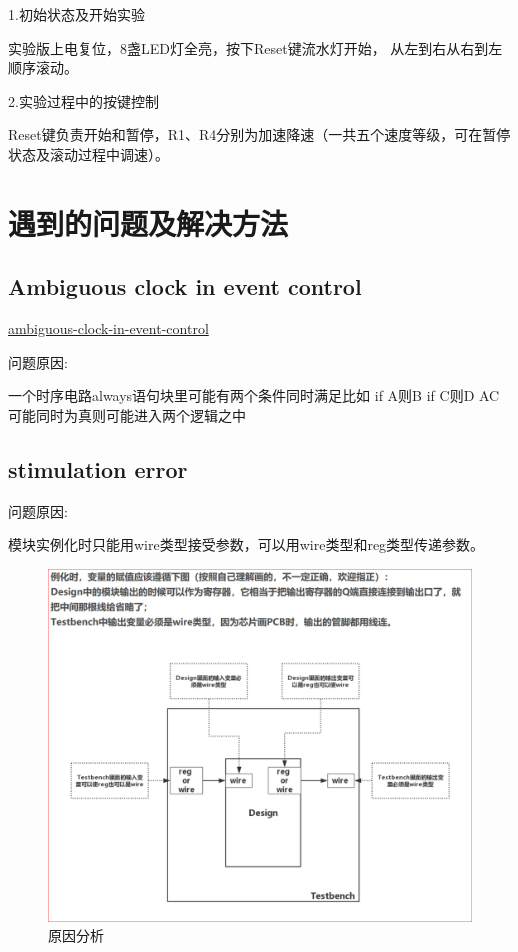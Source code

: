 \documentclass[UTF8]{article}
\begin{document}
1.初始状态及开始实验

实验版上电复位，8盏LED灯全亮，按下Reset键流水灯开始，
从左到右从右到左顺序滚动。

2.实验过程中的按键控制

Reset键负责开始和暂停，R1、R4分别为加速降速（一共五个速度等级，可在暂停状态及滚动过程中调速）。

\section{遇到的问题及解决方法}
\subsection{Ambiguous clock in event control}

\href{https://stackoverflow.com/questions/27145548/ambiguous-clock-in-event-control}{ambiguous-clock-in-event-control} 

问题原因: 

一个时序电路always语句块里可能有两个条件同时满足比如
    if A则B
    if C则D
AC可能同时为真则可能进入两个逻辑之中

\subsection{stimulation error}
问题原因:

模块实例化时只能用wire类型接受参数，可以用wire类型和reg类型传递参数。

\begin{figure}[H]
    \centering
    \includegraphics[width=\linewidth]{0.PNG}
    \caption{原因分析}
    \label{FIG.12}
\end{figure}
\end{document}
